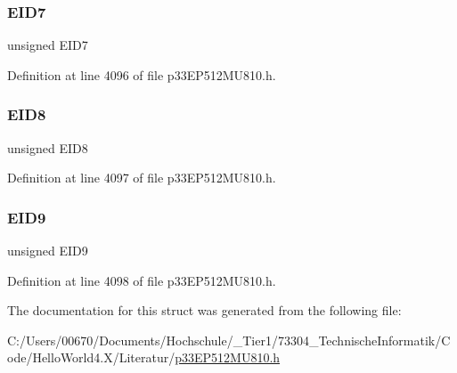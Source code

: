 \subsubsection{\texorpdfstring{E\+I\+D7}{EID7}}
{\footnotesize\ttfamily unsigned E\+I\+D7}



Definition at line 4096 of file p33\+E\+P512\+M\+U810.\+h.

\mbox{\label{structtag_c1_r_x_f6_e_i_d_b_i_t_s_acca25e0b7d86eb499d01f85222baea87}} 
\subsubsection{\texorpdfstring{E\+I\+D8}{EID8}}
{\footnotesize\ttfamily unsigned E\+I\+D8}



Definition at line 4097 of file p33\+E\+P512\+M\+U810.\+h.

\mbox{\label{structtag_c1_r_x_f6_e_i_d_b_i_t_s_ac6748f73d4ada8538b06548be4f396c2}} 
\subsubsection{\texorpdfstring{E\+I\+D9}{EID9}}
{\footnotesize\ttfamily unsigned E\+I\+D9}



Definition at line 4098 of file p33\+E\+P512\+M\+U810.\+h.



The documentation for this struct was generated from the following file\+:\begin{DoxyCompactItemize}
\item 
C\+:/\+Users/00670/\+Documents/\+Hochschule/\+\_\+\+Tier1/73304\+\_\+\+Technische\+Informatik/\+Code/\+Hello\+World4.\+X/\+Literatur/\hyperlink{p33_e_p512_m_u810_8h}{p33\+E\+P512\+M\+U810.\+h}\end{DoxyCompactItemize}
